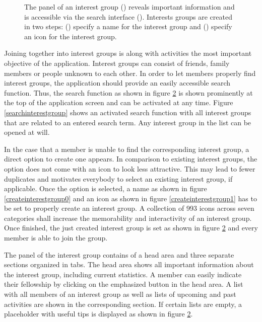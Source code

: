 \documentclass[12pt,numbers=noenddot,parskip,bibliography=totocnumbered,listof=totocnumbered,draft]{scrreprt}
\begin{document}
\begin{figure}
\begin{subfigure}[t]{0.45\textwidth}
\caption{}
\label{interestgroup}
\end{subfigure}%
\caption[Organization of interest groups]{The panel of an interest group () reveals important information and is accessible via the search interface (). Interests groups are created in two steps: () specify a name for the interest group and () specify an icon for the interest group.}
\end{figure}

Joining together into interest groups is along with activities the most important objective of the application. Interest groups can consist of friends, family members or people unknown to each other. In order to let members properly find interest groups, the application should provide an easily accessible search function. Thus, the search function as shown in figure \ref{interestgroup} is shown prominently at the top of the application screen and can be activated at any time. Figure \ref{searchinterestgroup} shows an activated search function with all interest groups that are related to an entered search term. Any interest group in the list can be opened at will. 

In the case that a member is unable to find the corresponding interest group, a direct option to create one appears. In comparison to existing interest groups, the option does not come with an icon to look less attractive. This may lead to fewer duplicates and motivates everybody to select an existing interest group, if applicable. Once the option is selected, a name as shown in figure \ref{createinterestgroup0} and an icon as shown in figure \ref{createinterestgroup1} has to be set to properly create an interest group. A collection of 993 icons across seven categories shall increase the memorability and interactivity of an interest group. Once finished, the just created interest group is set as shown in figure \ref{interestgroup} and every member is able to join the group.

The panel of the interest group contains of a head area and three separate sections organized in tabs. The head area shows all important information about the interest group, including current statistics. A member can easily indicate their fellowship by clicking on the emphasized button in the head area. A list with all members of an interest group as well as lists of upcoming and past activities are shown in the corresponding section. If certain lists are empty, a placeholder with useful tips is displayed as shown in figure \ref{interestgroup}. 
\end{document}
